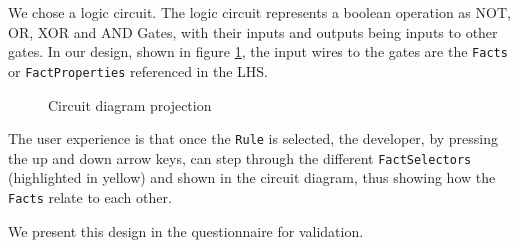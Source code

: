 We chose a logic circuit. 
The logic circuit represents a boolean operation as NOT, OR, XOR and AND Gates, with their inputs and outputs being inputs to other gates.
In our design, shown in figure \ref{fig:CircuitDiagramProjection}, the input wires to the gates are the \texttt{Facts} or \texttt{FactProperties} referenced in the LHS.

\begin{figure}
    \centering
    \caption{Circuit diagram projection}
    \label{fig:CircuitDiagramProjection}
\end{figure}

The user experience is that once the \texttt{Rule} is selected, the developer, by pressing the up and down arrow keys, can step through the different \texttt{FactSelectors} (highlighted in yellow) and shown in the circuit diagram, thus showing how the \texttt{Facts} relate to each other.

We present this design in the questionnaire for validation.


